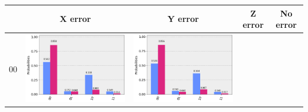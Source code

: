 \documentclass[11pt]{article}
\begin{document}
\begin{table}[h!]
    \centering
    \begin{tabular}{| c | c | c | c | c | }
      \hline
      & X error & Y error & Z error & No error \\ 
      \hline
      00 & 
      \begin{minipage}{.215\textwidth}
        \includegraphics[width=\linewidth]{img/one_qecc3_X00.png}
      \end{minipage}&
      \begin{minipage}{.215\textwidth}
        \includegraphics[width=\linewidth]{img/one_qecc3_Y00.png}
      \end{minipage}
      &\begin{minipage}{.215\textwidth}

\end{minipage}
\end{tabular}
\end{table}
\end{document}
